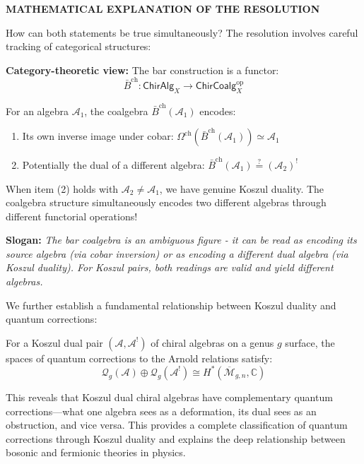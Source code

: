 \begin{remark}
\medskip
\noindent\textbf{MATHEMATICAL EXPLANATION OF THE RESOLUTION}

How can both statements be true simultaneously? The resolution involves careful tracking of categorical structures:

\textbf{Category-theoretic view:} The bar construction is a functor:
$$\bar{B}^{\text{ch}}: \mathsf{ChirAlg}_X \to \mathsf{ChirCoalg}_X^{\text{op}}$$

For an algebra $\mathcal{A}_1$, the coalgebra $\bar{B}^{\text{ch}}(\mathcal{A}_1)$ encodes:
\begin{enumerate}
\item Its own inverse image under cobar: $\Omega^{\text{ch}}(\bar{B}^{\text{ch}}(\mathcal{A}_1)) \simeq \mathcal{A}_1$
\item Potentially the dual of a different algebra: $\bar{B}^{\text{ch}}(\mathcal{A}_1) \stackrel{?}{=} (\mathcal{A}_2)^!$
\end{enumerate}

When item (2) holds with $\mathcal{A}_2 \neq \mathcal{A}_1$, we have genuine Koszul duality. The coalgebra structure simultaneously encodes two different algebras through different functorial operations!

\textbf{Slogan:} \emph{The bar coalgebra is an ambiguous figure - it can be read as encoding its source algebra (via cobar inversion) or as encoding a different dual algebra (via Koszul duality). For Koszul pairs, both readings are valid and yield different algebras.}
\end{remark}


We further establish a fundamental relationship between Koszul duality and quantum corrections:

\begin{theorem}
For a Koszul dual pair $(\mathcal{A}, \mathcal{A}^!)$ of chiral algebras on a genus $g$ surface, the spaces of quantum corrections to the Arnold relations satisfy:
$$\mathcal{Q}_g(\mathcal{A}) \oplus \mathcal{Q}_g(\mathcal{A}^!) \cong H^*(\overline{\mathcal{M}}_{g,n}, \mathbb{C})$$
\end{theorem}

This reveals that Koszul dual chiral algebras have complementary quantum corrections—what one algebra sees as a deformation, its dual sees as an obstruction, and vice versa. This provides a complete classification of quantum corrections through Koszul duality and explains the deep relationship between bosonic and fermionic theories in physics.



